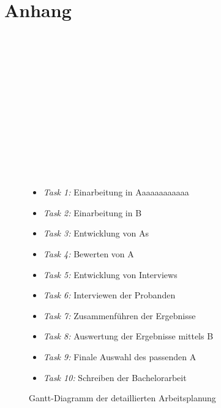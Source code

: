\section{Anhang}\label{sec:anhang}
\begin{figure}[!ht]
    \begin{ganttchart}{1}{15}
         \\
         \\
         \\
         \\
         \\
         \\
         \\
         \\
         \\
         \\
         \\
         \\
        \label{fig:gantchart}
    \end{ganttchart}
    \caption{Gantt-Diagramm der detaillierten Arbeitsplanung}
    \begin{itemize}
        \item \textit{Task 1:} Einarbeitung in Aaaaaaaaaaaa
        \item \textit{Task 2:} Einarbeitung in B
        \item \textit{Task 3:} Entwicklung von As
        \item \textit{Task 4:} Bewerten von A
        \item \textit{Task 5:} Entwicklung von Interviews
        \item \textit{Task 6:} Interviewen der Probanden
        \item \textit{Task 7:} Zusammenführen der Ergebnisse
        \item \textit{Task 8:} Auswertung der Ergebnisse mittels B
        \item \textit{Task 9:} Finale Auswahl des passenden A
        \item \textit{Task 10:} Schreiben der Bachelorarbeit
    \end{itemize}
\end{figure}